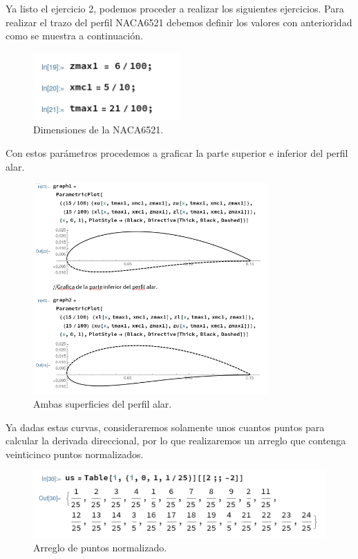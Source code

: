 \documentclass[12pt, letterpaper]{article}
\begin{document}
Ya listo el ejercicio 2, podemos proceder a realizar los siguientes ejercicios. Para realizar el trazo del perfil NACA6521 debemos definir los valores con anterioridad como se muestra a continuación.

\begin{figure}[H]
	\centering
	\includegraphics[width=0.5\textwidth]{5.png}
	\caption{Dimensiones de la NACA6521.}
\end{figure}

Con estos parámetros procedemos a graficar la parte superior e inferior del perfil alar.

\begin{figure}[H]
	\centering
	\includegraphics[width=0.8\textwidth]{6.png}
	\caption{Ambas superficies del perfil alar.}
\end{figure}

Ya dadas estas curvas, consideraremos solamente unos cuantos puntos para calcular la derivada direccional, por lo que realizaremos un arreglo que contenga veinticinco puntos normalizados.

\begin{figure}[H]
	\centering
	\includegraphics[width=\textwidth]{7.png}
	\caption{Arreglo de puntos normalizado.}
\end{figure}
\end{document}
